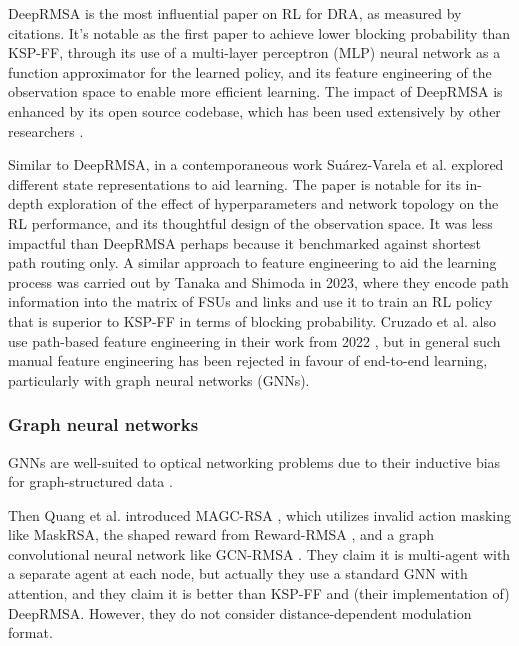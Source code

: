 DeepRMSA \cite{chen_deeprmsa_2019} is the most influential paper on RL for DRA, as measured by citations. It's notable as the first paper to achieve lower blocking probability than KSP-FF, through its use of a multi-layer perceptron (MLP) neural network as a function approximator for the learned policy, and its feature engineering of the observation space to enable more efficient learning. %
The impact of DeepRMSA is enhanced by its open source codebase, which has been used extensively by other researchers \cite{tang_heuristic_2022,xu_deep_2022,quang_magc-rsa_2022}.

Similar to DeepRMSA, in a contemporaneous work Su\'arez-Varela et al. \cite{suarez-varela_routing_2019} explored different state representations to aid learning. The paper is notable for its in-depth exploration of the effect of hyperparameters and network topology on the RL performance, and its thoughtful design of the observation space. It was less impactful than DeepRMSA perhaps because it benchmarked against shortest path routing only. A similar approach to feature engineering to aid the learning process was carried out by Tanaka and Shimoda \cite{tanaka_pre-_2023} in 2023, where they encode path information into the matrix of FSUs and links and use it to train an RL policy that is superior to KSP-FF in terms of blocking probability. Cruzado et al. also use path-based feature engineering in their work from 2022 \cite{cruzado_reinforcement-learning-based_2022}, but in general such manual feature engineering has been rejected in favour of end-to-end learning, particularly with graph neural networks (GNNs).


\subsubsection{Graph neural networks}
\label{sec:gnn_rl}

GNNs are well-suited to optical networking problems due to their inductive bias for graph-structured data \cite{xu_how_2018}. 


Then Quang et al. introduced MAGC-RSA \cite{quang_magc-rsa_2022}, which utilizes invalid action masking like MaskRSA, the shaped reward from Reward-RMSA \cite{tang_heuristic_2022}, and a graph convolutional neural network like GCN-RMSA \cite{xu_deep_2022}. They claim it is multi-agent with a separate agent at each node, but actually they use a standard GNN with attention, and they claim it is better than KSP-FF and (their implementation of) DeepRMSA. However, they do not consider distance-dependent modulation format.

